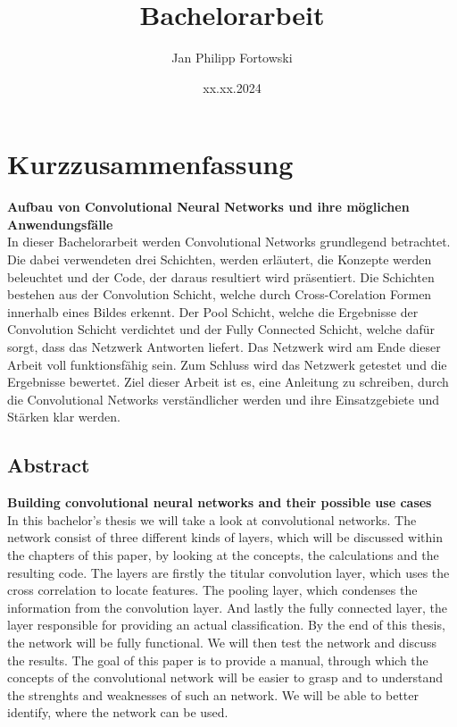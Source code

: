 \documentclass[12pt]{article}
\title{\textbf{Bachelorarbeit}}
\author{Jan Philipp Fortowski}
\date{xx.xx.2024}
\begin{document}

\thispagestyle{empty}

\cleardoublepage
\thispagestyle{empty}
\section*{Kurzzusammenfassung}
\textbf{Aufbau von Convolutional Neural Networks und
ihre möglichen Anwendungsfälle}\\

In dieser Bachelorarbeit werden Convolutional Networks grundlegend betrachtet. Die dabei verwendeten drei Schichten, werden erläutert, die Konzepte werden beleuchtet und der Code, der daraus resultiert wird präsentiert.  Die Schichten bestehen aus der Convolution Schicht, welche durch Cross-Corelation Formen innerhalb eines Bildes erkennt. Der Pool Schicht, welche die Ergebnisse der Convolution Schicht verdichtet und der Fully Connected Schicht, welche dafür sorgt, dass das Netzwerk Antworten liefert. Das Netzwerk wird am Ende dieser Arbeit voll funktionsfähig sein. Zum Schluss wird das Netzwerk getestet und die Ergebnisse bewertet. Ziel dieser Arbeit ist es, eine Anleitung zu schreiben, durch die Convolutional Networks verständlicher werden und ihre Einsatzgebiete und Stärken klar werden.

\cleardoublepage
\thispagestyle{empty}
\subsection*{Abstract}
\textbf{Building convolutional neural networks and their
possible use cases}\\

In this bachelor's thesis we will take a look at convolutional networks.
The network consist of three different kinds of layers, which will be discussed within the chapters of this paper, by looking at the concepts, the calculations and the resulting code. 
The layers are firstly the titular convolution layer, which uses the cross correlation to locate features. The pooling layer, which condenses the information from the convolution layer. And lastly the fully connected layer, the layer responsible for providing an actual classification.
By the end of this thesis, the network will be fully functional.
We will then test the network and discuss the results.
The goal of this paper is to provide a manual, through which the concepts of the convolutional network will be easier to grasp and to understand the strenghts and weaknesses of such an network. We will be able to better identify, where the network can be used.
\end{document}
